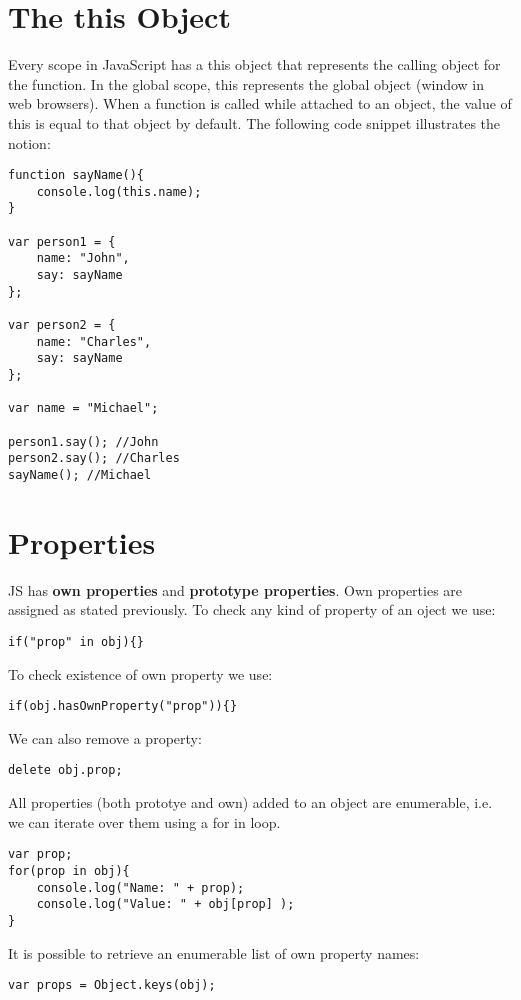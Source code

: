 \documentclass[12pt, a4paper]{article}
\begin{document}
\section{The this Object}
Every scope in JavaScript has a this object that represents the calling object for the function.
In the global scope, this represents the global object (window in web browsers).
When a function is called while attached to an object, the value of this is equal to that object by default.
The following code snippet illustrates the notion:
\begin{verbatim}
function sayName(){
    console.log(this.name);
}

var person1 = {
    name: "John",
    say: sayName
};

var person2 = {
    name: "Charles",
    say: sayName
};

var name = "Michael";

person1.say(); //John
person2.say(); //Charles
sayName(); //Michael
\end{verbatim}

\section{Properties}
JS has \textbf{own properties} and \textbf{prototype properties}. Own properties are assigned as stated previously.
To check any kind of property of an oject we use:
\begin{verbatim}
if("prop" in obj){}
\end{verbatim}
To check existence of own property we use:
\begin{verbatim}
if(obj.hasOwnProperty("prop")){}
\end{verbatim}
We can also remove a property:
\begin{verbatim}
delete obj.prop;
\end{verbatim}
All properties (both prototye and own) added to an object are enumerable,
i.e. we can iterate over them using a for in loop.
\begin{verbatim}
var prop;
for(prop in obj){
    console.log("Name: " + prop);
    console.log("Value: " + obj[prop] );   
}
\end{verbatim}
It is possible to retrieve an enumerable list of own property names:
\begin{verbatim}
var props = Object.keys(obj);
\end{verbatim}
\end{document}
